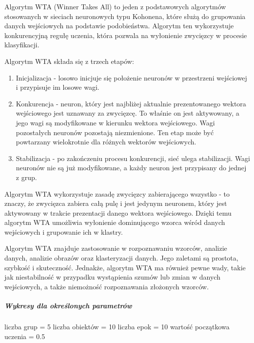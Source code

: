 \documentclass[11pt]{article}
\providecommand{\tightlist}{%
      \setlength{\itemsep}{0pt}\setlength{\parskip}{0pt}}
\begin{document}
Algorytm WTA (Winner Takes All) to jeden z podstawowych algorytmów
stosowanych w sieciach neuronowych typu Kohonena, które służą do
grupowania danych wejściowych na podstawie podobieństwa. Algorytm ten
wykorzystuje konkurencyjną regułę uczenia, która pozwala na wyłonienie
zwycięzcy w procesie klasyfikacji.

Algorytm WTA składa się z trzech etapów:

\begin{enumerate}
\def\labelenumi{\arabic{enumi}.}
\tightlist
\item
  Inicjalizacja - losowo inicjuje się położenie neuronów w przestrzeni
  wejściowej i przypisuje im losowe wagi.
\item
  Konkurencja - neuron, który jest najbliżej aktualnie prezentowanego
  wektora wejściowego jest uznawany za zwycięzcę. To właśnie on jest
  aktywowany, a jego wagi są modyfikowane w kierunku wektora
  wejściowego. Wagi pozostałych neuronów pozostają niezmienione. Ten
  etap może być powtarzany wielokrotnie dla różnych wektorów
  wejściowych.
\item
  Stabilizacja - po zakończeniu procesu konkurencji, sieć ulega
  stabilizacji. Wagi neuronów nie są już modyfikowane, a każdy neuron
  jest przypisany do jednej z grup.
\end{enumerate}

Algorytm WTA wykorzystuje zasadę zwycięzcy zabierającego wszystko - to
znaczy, że zwycięzca zabiera całą pulę i jest jedynym neuronem, który
jest aktywowany w trakcie prezentacji danego wektora wejściowego. Dzięki
temu algorytm WTA umożliwia wyłonienie dominującego wzorca wśród danych
wejściowych i grupowanie ich w klastry.

Algorytm WTA znajduje zastosowanie w rozpoznawaniu wzorców, analizie
danych, analizie obrazów oraz klasteryzacji danych. Jego zaletami są
prostota, szybkość i skuteczność. Jednakże, algorytm WTA ma również
pewne wady, takie jak niestabilność w przypadku wystąpienia szumów lub
zmian w danych wejściowych, a także niemożność rozpoznawania złożonych
wzorców.

\hypertarget{wykresy-dla-okreux15blonych-parametruxf3w}{%
\subparagraph{Wykresy dla określonych
parametrów}\label{wykresy-dla-okreux15blonych-parametruxf3w}}

liczba grup = 5 liczba obiektów = 10 liczba epok = 10 wartość początkowa
uczenia = 0.5
\end{document}
